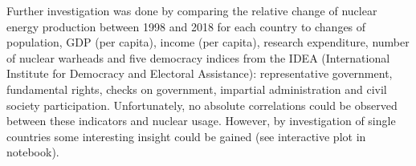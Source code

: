 \documentclass[a4paper,10pt,twocolumn]{scrartcl}
\begin{document}
Further investigation was done by comparing the relative change of nuclear energy production between 1998 and 2018 for each country to changes of population, GDP (per capita), income (per capita), research expenditure, number of nuclear warheads and five democracy indices from the IDEA (International Institute for Democracy and Electoral Assistance): representative government, fundamental rights, checks on government, impartial administration and civil society participation. Unfortunately, no absolute correlations could be observed between these indicators and nuclear usage. However, by investigation of single countries some interesting insight could be gained (see interactive plot in notebook).
\end{document}

